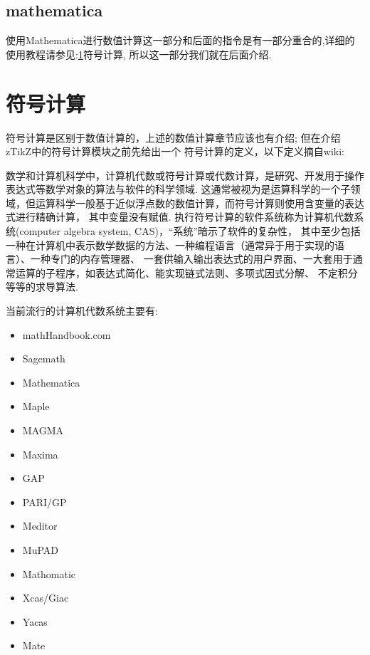 \subsection{mathematica}
使用Mathematica进行数值计算这一部分和后面的\cmd{\wolfram}\index{\cmd{\wolfram}}指令是有一部分重合的,详细的
使用教程请参见:\cref{sec:symbol}符号计算, 所以这一部分我们就在后面介绍.


\section{符号计算}\label{sec:symbol}
符号计算是区别于数值计算的，上述的数值计算章节应该也有介绍; 但在介绍zTikZ中的符号计算模块之前先给出一个
符号计算的定义，以下定义摘自wiki:

\begin{leftbar}
\kaishu 数学和计算机科学中，计算机代数或符号计算或代数计算，是研究、开发用于操作表达式等数学对象的算法与软件的科学领域.
这通常被视为是运算科学的一个子领域，但运算科学一般基于近似浮点数的数值计算，而符号计算则使用含变量的表达式进行精确计算，
其中变量没有赋值. 执行符号计算的软件系统称为计算机代数系统(computer algebra system, CAS)，``系统''暗示了软件的复杂性，
其中至少包括一种在计算机中表示数学数据的方法、一种编程语言（通常异于用于实现的语言）、一种专门的内存管理器、
一套供输入输出表达式的用户界面、一大套用于通常运算的子程序，如表达式简化、能实现链式法则、多项式因式分解、
不定积分等等的求导算法.
\end{leftbar}

当前流行的计算机代数系统主要有:
\begin{multicols}{2}
    \begin{itemize}
    \item mathHandbook.com
    \item Sagemath
    \item Mathematica
    \item Maple
    \item MAGMA
    \item Maxima
    \item GAP
    \item PARI/GP
    \item Meditor
    \item MuPAD
    \item Mathomatic
    \item Xcas/Giac
    \item Yacas
    \item Mate
    \end{itemize}
\end{multicols}


